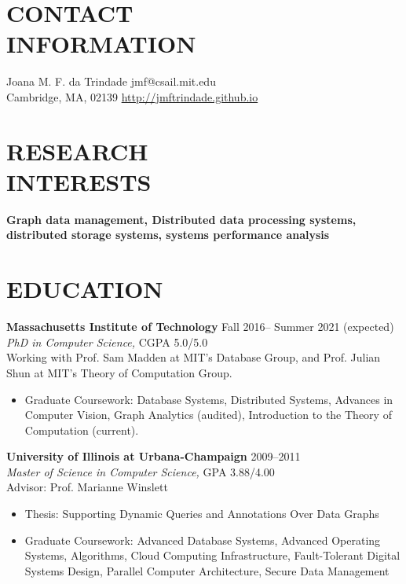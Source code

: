 \documentclass[line,margin]{res}
\begin{document}
 
\begin{resume}
 
\section{CONTACT \\ INFORMATION}  Joana M. F. da Trindade \hfill jmf@csail.mit.edu \\
               Cambridge, MA, 02139 \hfill \url{http://jmftrindade.github.io}

\section{RESEARCH \\ INTERESTS}       \textbf{Graph data management, Distributed data processing systems, distributed storage systems, systems performance analysis}
 
\section{EDUCATION} \textbf{Massachusetts Institute of Technology} \hfill Fall
  2016-- Summer 2021 (expected) \\
                {\sl PhD in Computer Science,} CGPA 5.0/5.0 \\
                Working with Prof. Sam Madden at MIT's Database Group, and Prof. Julian Shun at MIT's Theory of Computation Group.
                \begin{itemize}  \itemsep -2pt
                    \item Graduate Coursework: Database Systems, Distributed
                      Systems, Advances in Computer Vision, Graph Analytics
                      (audited), Introduction to the Theory of Computation
                      (current).
                \end{itemize}

                \textbf{University of Illinois at Urbana-Champaign} \hfill 2009--2011 \\
                {\sl Master of Science in Computer Science,}  GPA 3.88/4.00 \\
                Advisor: Prof. Marianne Winslett
                \begin{itemize}  \itemsep -2pt
                \item  Thesis: Supporting Dynamic Queries and Annotations Over Data Graphs
                \item Graduate Coursework: Advanced Database Systems, Advanced Operating Systems, Algorithms, Cloud Computing Infrastructure, Fault-Tolerant Digital Systems Design, Parallel Computer Architecture, Secure Data Management
                \end{itemize}


\end{resume}
\end{document}

